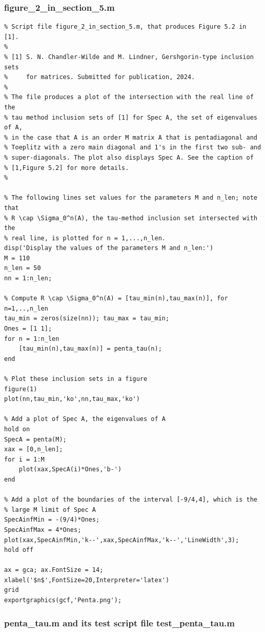 \documentclass[preprint,1p,11pt]{elsarticle}
\numberwithin{equation}{section}   %
\numberwithin{figure}{section}  %
\begin{document}
\subsubsection{figure\_2\_in\_section\_5.m} \label{code:fig2}
\begin{verbatim}
% Script file figure_2_in_section_5.m, that produces Figure 5.2 in [1].
%
% [1] S. N. Chandler-Wilde and M. Lindner, Gershgorin-type inclusion sets
%     for matrices. Submitted for publication, 2024.
%
% The file produces a plot of the intersection with the real line of the
% tau method inclusion sets of [1] for Spec A, the set of eigenvalues of A,
% in the case that A is an order M matrix A that is pentadiagonal and 
% Toeplitz with a zero main diagonal and 1's in the first two sub- and 
% super-diagonals. The plot also displays Spec A. See the caption of 
% [1,Figure 5.2] for more details.
%

% The following lines set values for the parameters M and n_len; note that
% R \cap \Sigma_0^n(A), the tau-method inclusion set intersected with the
% real line, is plotted for n = 1,...,n_len.
disp('Display the values of the parameters M and n_len:')
M = 110
n_len = 50
nn = 1:n_len;

% Compute R \cap \Sigma_0^n(A) = [tau_min(n),tau_max(n)], for n=1,..,n_len
tau_min = zeros(size(nn)); tau_max = tau_min;
Ones = [1 1];
for n = 1:n_len
    [tau_min(n),tau_max(n)] = penta_tau(n);
end

% Plot these inclusion sets in a figure
figure(1)
plot(nn,tau_min,'ko',nn,tau_max,'ko')

% Add a plot of Spec A, the eigenvalues of A
hold on
SpecA = penta(M);
xax = [0,n_len];
for i = 1:M
    plot(xax,SpecA(i)*Ones,'b-')
end

% Add a plot of the boundaries of the interval [-9/4,4], which is the
% large M limit of Spec A
SpecAinfMin = -(9/4)*Ones;
SpecAinfMax = 4*Ones;
plot(xax,SpecAinfMin,'k--',xax,SpecAinfMax,'k--','LineWidth',3);
hold off

ax = gca; ax.FontSize = 14;
xlabel('$n$',FontSize=20,Interpreter='latex')
grid
exportgraphics(gcf,'Penta.png');
\end{verbatim}

\subsubsection{penta\_tau.m and its test script file test\_penta\_tau.m} \label{code:pentau}
\end{document}
